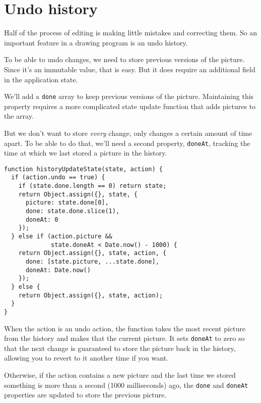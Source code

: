 \section{Undo history}

Half of the process of editing is making little mistakes and correcting them. So an important feature in a drawing program is an undo history.

To be able to undo changes, we need to store previous versions of the picture. Since it's an immutable value, that is easy. But it does require an additional field in the application state.

We'll add a \lstinline`done` array to keep previous versions of the picture. Maintaining this property requires a more complicated state update function that adds pictures to the array.

But we don't want to store \emph{every} change, only changes a certain amount of time apart. To be able to do that, we'll need a second property, \lstinline`doneAt`, tracking the time at which we last stored a picture in the history.

\begin{lstlisting}
function historyUpdateState(state, action) {
  if (action.undo == true) {
    if (state.done.length == 0) return state;
    return Object.assign({}, state, {
      picture: state.done[0],
      done: state.done.slice(1),
      doneAt: 0
    });
  } else if (action.picture &&
             state.doneAt < Date.now() - 1000) {
    return Object.assign({}, state, action, {
      done: [state.picture, ...state.done],
      doneAt: Date.now()
    });
  } else {
    return Object.assign({}, state, action);
  }
}
\end{lstlisting}
\noindent{}

When the action is an undo action, the function takes the most recent picture from the history and makes that the current picture. It sets \lstinline`doneAt` to zero so that the next change is guaranteed to store the picture back in the history, allowing you to revert to it another time if you want.

Otherwise, if the action contains a new picture and the last time we stored something is more than a second (1000 milliseconds) ago, the \lstinline`done` and \lstinline`doneAt` properties are updated to store the previous picture.

